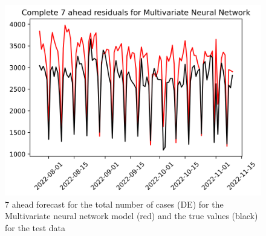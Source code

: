\begin{figure}
\begin{minipage}{.32\textwidth}
  \label{fig:tot_cases_fc_7_mvnn}
\end{minipage}
\begin{minipage}{.32\textwidth}
  \centering
  \includegraphics[width=\linewidth]{pics/7_ah/DE_Complete_7_ahead_Multivariate Neural Network.png}
  \caption{7 ahead forecast for the total number of cases (DE) for the Multivariate neural network model (red) and the true values (black) for the test data}
  \label{fig:tot_cases_fc_7_mvnn_DE}
\end{minipage}

\end{figure}
